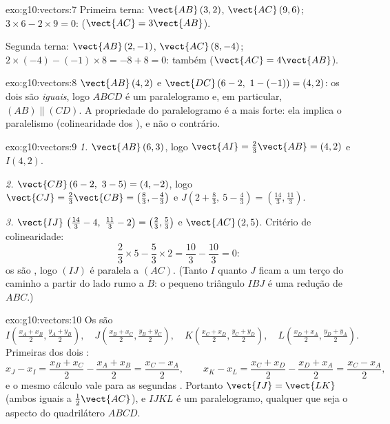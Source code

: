\begin{solution}{exo:g10:vectors:7}
Primeira terna: $\vect{AB}\,(3, 2)$, $\vect{AC}\,(9, 6)$;
$3 \times 6 - 2 \times 9 = 0$:  ($\vect{AC} = 3\vect{AB}$).

Segunda terna: $\vect{AB}\,(2, -1)$, $\vect{AC}\,(8, -4)$;
$2 \times (-4) - (-1) \times 8 = -8 + 8 = 0$: também 
($\vect{AC} = 4\vect{AB}$).
\end{solution}

\begin{solution}{exo:g10:vectors:8}
$\vect{AB}\,(4, 2)$ e $\vect{DC}\,(6-2,\ 1-(-1)) = (4, 2)$: os dois
 são \emph{iguais}, logo $ABCD$ é um paralelogramo e, em
particular, $(AB) \parallel (CD)$. A propriedade do paralelogramo é a
mais forte: ela implica o paralelismo (colinearidade dos ), e não
o contrário.
\end{solution}

\begin{solution}{exo:g10:vectors:9}
\emph{1.} $\vect{AB}\,(6, 3)$, logo
$\vect{AI} = \frac23\vect{AB} = (4, 2)$ e $I(4, 2)$.

\emph{2.} $\vect{CB}\,(6-2,\ 3-5) = (4, -2)$, logo
$\vect{CJ} = \frac23\vect{CB} = \left(\frac83, -\frac43\right)$ e
$J\left(2 + \frac83,\ 5 - \frac43\right) = \left(\frac{14}{3},
\frac{11}{3}\right)$.

\emph{3.} $\vect{IJ}\,\left(\frac{14}{3} - 4,\ \frac{11}{3} - 2\right) =
\left(\frac23, \frac53\right)$ e $\vect{AC}\,(2, 5)$. Critério de
colinearidade:
\[
\frac23 \times 5 - \frac53 \times 2 = \frac{10}{3} - \frac{10}{3} = 0 :
\]
os  são , logo $(IJ)$ é paralela a $(AC)$. (Tanto $I$
quanto $J$ ficam a um terço do caminho a partir do lado rumo a $B$: o
pequeno triângulo $IBJ$ é uma redução de $ABC$.)
\end{solution}

\begin{solution}{exo:g10:vectors:10}
Os  são
\[
I\left(\tfrac{x_A + x_B}{2}, \tfrac{y_A + y_B}{2}\right), \quad
J\left(\tfrac{x_B + x_C}{2}, \tfrac{y_B + y_C}{2}\right), \quad
K\left(\tfrac{x_C + x_D}{2}, \tfrac{y_C + y_D}{2}\right), \quad
L\left(\tfrac{x_D + x_A}{2}, \tfrac{y_D + y_A}{2}\right).
\]
Primeiras  dos dois :
\[
x_J - x_I = \frac{x_B + x_C}{2} - \frac{x_A + x_B}{2}
= \frac{x_C - x_A}{2},
\qquad
x_K - x_L = \frac{x_C + x_D}{2} - \frac{x_D + x_A}{2}
= \frac{x_C - x_A}{2},
\]
e o mesmo cálculo vale para as segundas . Portanto
$\vect{IJ} = \vect{LK}$ (ambos iguais a $\frac12\vect{AC}$), e $IJKL$ é
um paralelogramo, qualquer que seja o aspecto do quadrilátero $ABCD$.
\end{solution}

